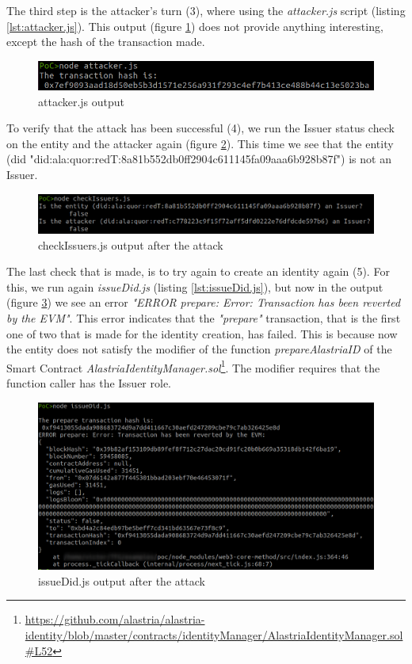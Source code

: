 The third step is the attacker's turn (3), where using the \textit{attacker.js} script (listing \ref{lst:attacker.js}). This output (figure \ref{fig:poc-3}) does not provide anything interesting, except the hash of the transaction made.\\
\begin{figure}[h]
    \centering
    \includegraphics[width=1.0\textwidth]{images/PoC/3.png}
    \caption{attacker.js output}
    \label{fig:poc-3}
\end{figure}

To verify that the attack has been successful (4), we run the Issuer status check on the entity and the attacker again (figure \ref{fig:poc-4}). This time we see that the entity (\acrshort{did} "did:ala:quor:redT:8a81b552db0ff2904c611145fa09aaa6b928b87f") is not an Issuer.\\
\begin{figure}[h]
    \centering
    \includegraphics[width=1.0\textwidth]{images/PoC/4.png}
    \caption{checkIssuers.js output after the attack}
    \label{fig:poc-4}
\end{figure}

The last check that is made, is to try again to create an identity again (5). For this, we run again \textit{issueDid.js} (listing \ref{lst:issueDid.js}), but now in the output (figure \ref{fig:poc-5}) we see an error \textit{"ERROR prepare: Error: Transaction has been reverted by the EVM"}. This error indicates that the \textit{"prepare"} transaction, that is the first one of two that is made for the identity creation, has failed. This is because now the entity does not satisfy the modifier of the function \textit{prepareAlastriaID} of the Smart Contract \textit{AlastriaIdentityManager.sol}\footnote{\url{https://github.com/alastria/alastria-identity/blob/master/contracts/identityManager/AlastriaIdentityManager.sol\#L52}}. The modifier requires that the function caller has the Issuer role.
\begin{figure}[h]
    \centering
    \includegraphics[width=1.0\textwidth]{images/PoC/5.png}
    \caption{issueDid.js output after the attack}
    \label{fig:poc-5}
\end{figure}
